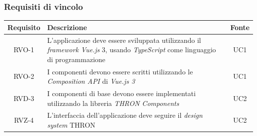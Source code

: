 \pagebreak
\subsubsection{Requisiti di vincolo}

\begin{center}
\label{tab:requisiti-vincolo}
\begin{longtable}{|c|p{}|c|}
\hline
\textbf{Requisito} & \textbf{Descrizione} & \textbf{Fonte}\\
\hline
RVO-1 & L'applicazione deve essere sviluppata utilizzando il \textit{framework Vue.js} 3, usando \textit{TypeScript} come linguaggio di programmazione & UC1 \\
\hline
RVO-2 & I componenti devono essere scritti utilizzando le \textit{Composition API} di \textit{Vue.js 3} & UC1 \\
\hline
RVD-3 & I componenti di base devono essere implementati utilizzando la libreria \textit{THRON Components} & UC2 \\
\hline
RVZ-4 & L'interfaccia dell'applicazione deve seguire il \textit{design system} THRON & UC2 \\
\hline
\end{longtable}
\end{center}